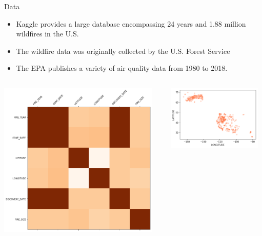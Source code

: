 \documentclass{beamer}
\begin{document}
\begin{frame}{Data}
\begin{itemize}
\item Kaggle provides a large database encompassing 24 years and 1.88 million wildfires in the U.S.
\item The wildfire data was originally collected by the U.S. Forest Service
\item The EPA publishes a variety of air quality data from 1980 to 2018.
\end{itemize}
\end{frame}

\begin{frame}[plain]
\begin{columns}[T]
\noindent
\begin{column}{0.5\textwidth}
\includegraphics[width=0.95\textwidth]{correlation.png}
\end{column}
\hfill
\begin{column}{0.5\textwidth}
\includegraphics[width=0.95\textwidth]{map.png}


\end{column}
\end{columns}
\end{frame}
\end{document}
